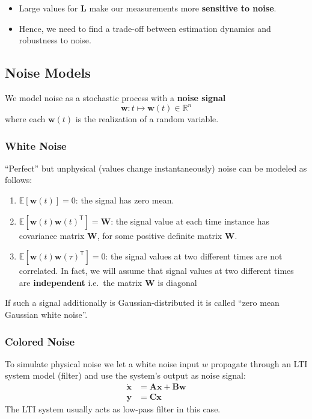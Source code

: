\newpar{}


\begin{itemize}
    \item Large values for $\mathbf{L}$ make our measurements more \textbf{sensitive to noise}.
    \item Hence, we need to find a trade-off between estimation dynamics and robustness to noise.
\end{itemize}

\subsection{Noise Models}
We model noise as a stochastic process with a \textbf{noise signal}
\begin{equation*}
    \mathbf{w}:t\mapsto \mathbf{w}(t)\in\mathbb{R}^n
\end{equation*}
where each $\mathbf{w}(t)$ is the realization of a random variable.

\subsubsection{White Noise}
``Perfect'' but unphysical (values change instantaneously) noise can be modeled as follows:
\begin{enumerate}
    \item $\mathbb{E}[\mathbf{w}(t)]=0$:\newline
          the signal has zero mean.
    \item $\mathbb{E}[\mathbf{w}(t){\mathbf{w}(t)}^{\mathsf{T}}]=\mathbf{W}$:\newline
          the signal value at each time instance has covariance matrix $\mathbf{W}$, for some positive definite matrix $\mathbf{W}$.
    \item $\mathbb{E}[\mathbf{w}(t){\mathbf{w}(\tau)}^{\mathsf{T}}]=0$:\newline
          the signal values at two different times are not correlated. In fact, we will assume that signal values at two different times are \textbf{independent} i.e.\ the matrix $\mathbf{W}$ is diagonal
\end{enumerate}
If such a signal additionally is Gaussian-distributed it is called ``zero mean Gaussian white noise''.

\subsubsection{Colored Noise}
To simulate physical noise we let a white noise input $w$ propagate through an LTI system model (filter) and use the system's output as noise signal:
\begin{align*}
    \dot{\mathbf{x}} & =\mathbf{Ax}+\mathbf{Bw} \\
    \mathbf{ y}      & = \mathbf{Cx}
\end{align*}
The LTI system usually acts as low-pass filter in this case.


